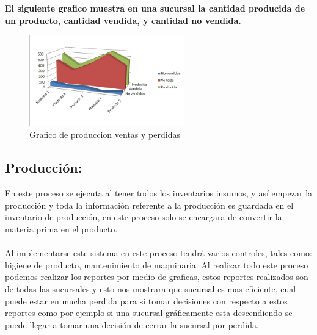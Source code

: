 \begin{itemize}
		\\%
		\\%
				\textbf{El siguiente grafico muestra en una sucursal la cantidad producida de un producto, cantidad vendida, y cantidad no vendida.}
\begin{figure}[htbp]
	\centering
		\includegraphics[width=0.60\textwidth]{images/Producidavendidaperdida.jpg}
	\caption{Grafico de produccion ventas y perdidas}
	\label{fig:Grafico de produccion ventas y perdidas}
\end{figure}%
%	
	\end{itemize}
	\subsection{Producci\'on:}En este proceso se ejecuta al tener todos los inventarios insumos, y as\'i empezar la producci\'on y toda la informaci\'on referente a la producci\'on es guardada en el inventario de producci\'on, en este proceso solo se encargara de convertir la materia prima en el producto.	
\\%
\\%
Al implementarse este sistema en este proceso tendr\'a varios controles, tales como: higiene de producto, mantenimiento de maquinaria. Al realizar todo este proceso podemos realizar los reportes por medio de graficas, estos reportes realizados son de todas las sucursales y esto nos mostrara que sucursal es mas eficiente, cual puede estar en mucha perdida para si tomar decisiones con respecto a estos reportes como por ejemplo si una sucursal gr\'aficamente esta descendiendo se puede llegar a tomar una decisi\'on de cerrar la sucursal por perdida.
